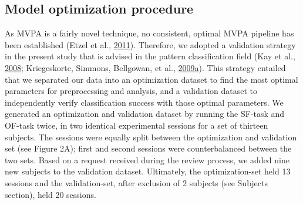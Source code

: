 \documentclass[11pt,american,a4paper,oneside,]{memoir} %
\begin{document}
\hypertarget{shared-states-methods-model-optimization-procedure}{%
\subsection{Model optimization procedure}\label{shared-states-methods-model-optimization-procedure}}

As MVPA is a fairly novel technique, no consistent, optimal MVPA pipeline has been established (Etzel et al., \protect\hyperlink{ref-etzel2011impact}{2011}). Therefore, we adopted a validation strategy in the present study that is advised in the pattern classification field (Kay et al., \protect\hyperlink{ref-kay2008identifying}{2008}; Kriegeskorte, Simmons, Bellgowan, et al., \protect\hyperlink{ref-kriegeskorte2009circular}{2009}\protect\hyperlink{ref-kriegeskorte2009circular}{a}). This strategy entailed that we separated our data into an optimization dataset to find the most optimal parameters for preprocessing and analysis, and a validation dataset to independently verify classification success with those optimal parameters. We generated an optimization and validation dataset by running the SF-task and OF-task twice, in two identical experimental sessions for a set of thirteen subjects. The sessions were equally split between the optimization and validation set (see Figure 2A); first and second sessions were counterbalanced between the two sets. Based on a request received during the review process, we added nine new subjects to the validation dataset. Ultimately, the optimization-set held 13 sessions and the validation-set, after exclusion of 2 subjects (see Subjects section), held 20 sessions.
\end{document}
